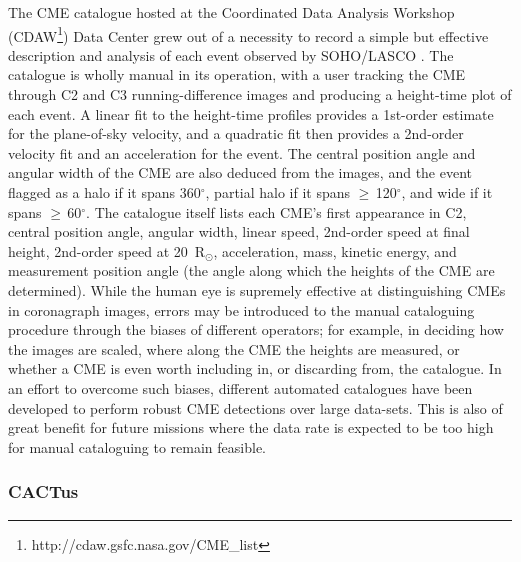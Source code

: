 \documentclass[namedreferences]{SolarPhysics}
\begin{document}
\begin{article}
The CME catalogue hosted at the Coordinated Data Analysis Workshop (CDAW\footnote{http://cdaw.gsfc.nasa.gov/CME\_list}) Data Center grew out of a necessity to record a simple but effective description and analysis of each event observed by SOHO/LASCO \citep{2009EM&P..104..295G}. The catalogue is wholly manual in its operation, with a user tracking the CME through C2 and C3 running-difference images and producing a height-time plot of each event. A linear fit to the height-time profiles provides a 1st-order estimate for the plane-of-sky velocity, and a quadratic fit then provides a 2nd-order velocity fit and an acceleration for the event. The central position angle and angular width of the CME are also deduced from the images, and the event flagged as a halo if it spans 360$^{\circ}$, partial halo if it spans $\ge$\,120$^{\circ}$, and wide if it spans $\ge$\,60$^{\circ}$. The catalogue itself lists each CME's first appearance in C2, central position angle, angular width, linear speed, 2nd-order speed at final height, 2nd-order speed at 20~R$_{\odot}$, acceleration, mass, kinetic energy, and measurement position angle (the angle along which the heights of the CME are determined). While the human eye is supremely effective at distinguishing CMEs in coronagraph images, errors may be introduced to the manual cataloguing procedure through the biases of different operators; for example, in deciding how the images are scaled, where along the CME the heights are measured, or whether a CME is even worth including in, or discarding from, the catalogue. In an effort to overcome such biases, different automated catalogues have been developed to perform robust CME detections over large data-sets. This is also of great benefit for future missions where the data rate is expected to be too high for manual cataloguing to remain feasible.

\subsubsection{CACTus}



\end{article}
\end{document}

